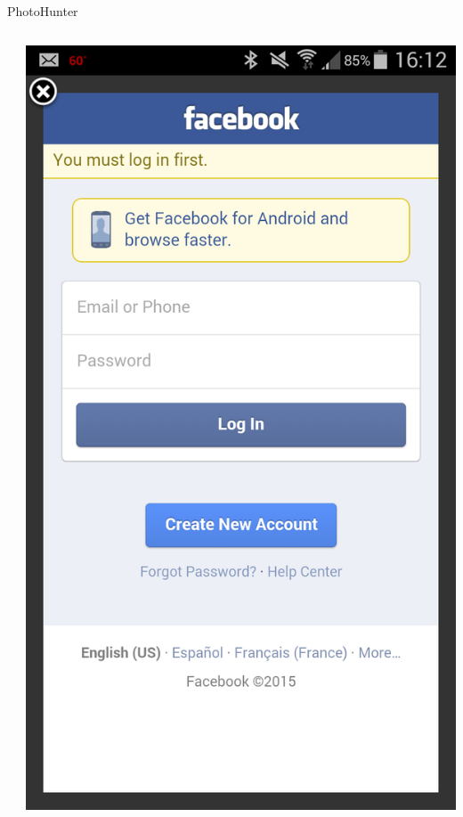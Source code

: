 \documentclass[aspectratio=169]{beamer}
\begin{document}
\begin{frame}{PhotoHunter}
\begin{columns}[c]
\begin{column}{0.5\columnwidth}
    \end{column}
    \begin{column}{0.5\columnwidth}
      \centering
      \includegraphics[width=\textwidth,height=\textheight,keepaspectratio]{photohunter/fb}
    \end{column}
  \end{columns}
\end{frame}
\end{document}

